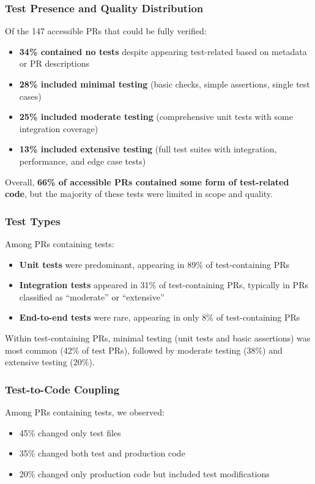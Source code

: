 \documentclass[conference]{IEEEtran}
\begin{document}
\subsubsection{Test Presence and Quality Distribution}

Of the 147 accessible PRs that could be fully verified:
\begin{itemize}
    \item \textbf{34\% contained no tests} despite appearing test-related based on metadata or PR descriptions
    \item \textbf{28\% included minimal testing} (basic checks, simple assertions, single test cases)
    \item \textbf{25\% included moderate testing} (comprehensive unit tests with some integration coverage)
    \item \textbf{13\% included extensive testing} (full test suites with integration, performance, and edge case tests)
\end{itemize}

Overall, \textbf{66\% of accessible PRs contained some form of test-related code}, but the majority of these tests were limited in scope and quality.

\subsubsection{Test Types}

Among PRs containing tests:
\begin{itemize}
    \item \textbf{Unit tests} were predominant, appearing in 89\% of test-containing PRs
    \item \textbf{Integration tests} appeared in 31\% of test-containing PRs, typically in PRs classified as ``moderate'' or ``extensive''
    \item \textbf{End-to-end tests} were rare, appearing in only 8\% of test-containing PRs
\end{itemize}

Within test-containing PRs, minimal testing (unit tests and basic assertions) was most common (42\% of test PRs), followed by moderate testing (38\%) and extensive testing (20\%).

\subsubsection{Test-to-Code Coupling}

Among PRs containing tests, we observed:
\begin{itemize}
    \item 45\% changed only test files
    \item 35\% changed both test and production code
    \item 20\% changed only production code but included test modifications
\end{itemize}
\end{document}
